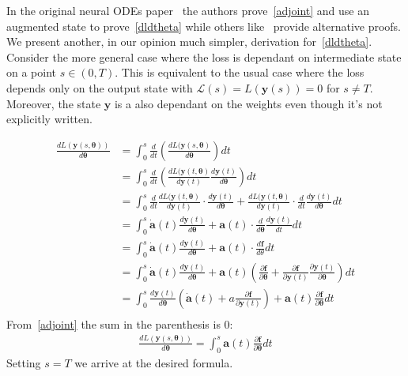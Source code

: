 \documentclass{article}
\begin{document}
    In the original neural ODEs paper~\cite{chen2018neural} the authors prove~\eqref{adjoint} and use an augmented state to prove~\eqref{dldtheta} while others like~\cite{kidger2022neural} provide alternative proofs.
    We present another, in our opinion much simpler, derivation for~\eqref{dldtheta}.
    Consider the more general case where the loss is dependant on intermediate state on a point $s \in (0,T)$.
    This is equivalent to the usual case where the loss depends only on the output state with $\mathcal{L}(s) = L(\pmb{y}(s))=0$ for $s\neq T$.
    Moreover, the state $\pmb{y}$ is a also dependant on the weights even though it's not explicitly written.

    \begin{align*}
        \frac{ d L(\bm{y}(s, \bm{\theta})) }{ d \bm{\theta} }
        &= \int_0^s \frac{d}{dt} \left( \frac{ d L(\bm{y}(s, \bm{\theta})}{ d \bm{\theta}} \right) dt \\
        &= \int_0^s \frac{d}{dt} \left( \frac{ d L(\bm{y}(t, \bm{\theta})}{ d \bm{y}(t)} \frac{d \bm{y}(t)}{d\bm{\theta}} \right) dt \\
        &= \int_0^s
        \frac{d}{dt} \frac{ d L(\bm{y}(t, \bm{\theta})}{ d \bm{y}(t)} \cdot \frac{d \bm{y}(t)}{d\bm{\theta}}
        +
        \frac{ d L(\bm{y}(t, \bm{\theta})}{ d \bm{y}(t)} \cdot \frac{d}{dt} \frac{d \bm{y}(t)}{d\bm{\theta}}
        dt \\
        &= \int_0^s
        \dot{\bm{a}}(t) \frac{d \bm{y}(t)}{d\bm{\theta}}
        +
        \bm{a}(t) \cdot \frac{d}{d\bm{\theta}} \frac{d \bm{y}(t)}{dt}
        dt \\
        &= \int_0^s
        \dot{\bm{a}}(t) \frac{d \bm{y}(t)}{d\bm{\theta}}
        +
        \bm{a}(t) \cdot \frac{d\bm{f}}{d\theta}
        dt \\
        &= \int_0^s
        \dot{\bm{a}}(t) \frac{d \bm{y}(t)}{d\bm{\theta}}
        +
        \bm{a}(t) \left( \frac{\partial \bm{f}}{\partial \bm{\theta}}
        +
        \frac{\partial \bm{f}}{\partial \bm{y}(t)} \frac{\partial \bm{y}(t)}{\partial \bm{\theta}}\right)
        dt \\
        &= \int_0^s
        \frac{d \bm{y}(t)}{d\bm{\theta}}
        \left( \dot{\bm{a}}(t) + a\frac{\partial \bm{f}}{\partial \bm{y}(t)} \right)
        +
        \bm{a}(t) \frac{\partial \bm{f}}{\partial \bm{\theta}}
        dt \\
    \end{align*}
    From~\eqref{adjoint} the sum in the parenthesis is 0:
    \begin{align}
        \frac{ d L(\bm{y}(s, \bm{\theta})) }{ d \bm{\theta} }
        = \int_0^s
        \bm{a}(t) \frac{\partial \bm{f}}{\partial \bm{\theta}}
        dt
    \end{align}
    Setting $s=T$ we arrive at the desired formula.
\end{document}
